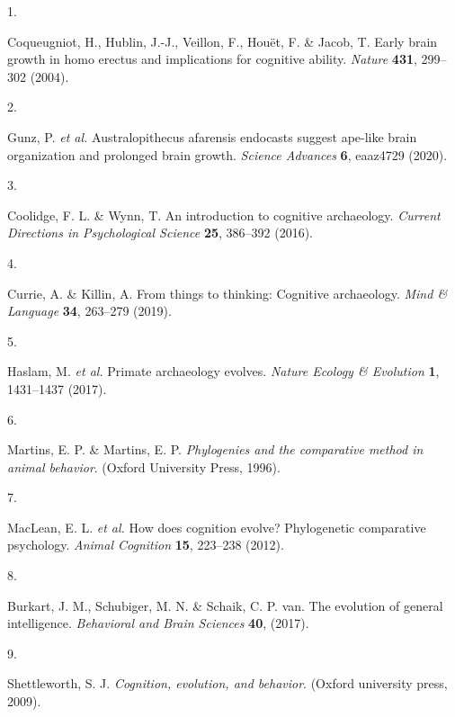 \documentclass[
  man,floatsintext]{apa6}
\newlength{\cslhangindent}
\newlength{\csllabelwidth}
\newlength{\cslentryspacingunit} %
\newenvironment{CSLReferences}[2] %
 {%
  \setlength{\parindent}{0pt}
  \ifodd #1
  \let\oldpar\par
  \def\par{\hangindent=\cslhangindent\oldpar}
  \fi
  \setlength{\parskip}{#2\cslentryspacingunit}
 }%
 {}
\newcommand{\CSLLeftMargin}[1]{\parbox[t]{\csllabelwidth}{#1}}
\newcommand{\CSLRightInline}[1]{\parbox[t]{\linewidth - \csllabelwidth}{#1}\break}
\begin{document}
\hypertarget{refs}{}
\begin{CSLReferences}{0}{0}
\leavevmode{}%
\CSLLeftMargin{1. }%
\CSLRightInline{Coqueugniot, H., Hublin, J.-J., Veillon, F., Houët, F. \& Jacob, T. Early brain growth in homo erectus and implications for cognitive ability. \emph{Nature} \textbf{431}, 299--302 (2004).}

\leavevmode{}%
\CSLLeftMargin{2. }%
\CSLRightInline{Gunz, P. \emph{et al.} Australopithecus afarensis endocasts suggest ape-like brain organization and prolonged brain growth. \emph{Science Advances} \textbf{6}, eaaz4729 (2020).}

\leavevmode{}%
\CSLLeftMargin{3. }%
\CSLRightInline{Coolidge, F. L. \& Wynn, T. An introduction to cognitive archaeology. \emph{Current Directions in Psychological Science} \textbf{25}, 386--392 (2016).}

\leavevmode{}%
\CSLLeftMargin{4. }%
\CSLRightInline{Currie, A. \& Killin, A. From things to thinking: Cognitive archaeology. \emph{Mind \& Language} \textbf{34}, 263--279 (2019).}

\leavevmode{}%
\CSLLeftMargin{5. }%
\CSLRightInline{Haslam, M. \emph{et al.} Primate archaeology evolves. \emph{Nature Ecology \& Evolution} \textbf{1}, 1431--1437 (2017).}

\leavevmode{}%
\CSLLeftMargin{6. }%
\CSLRightInline{Martins, E. P. \& Martins, E. P. \emph{Phylogenies and the comparative method in animal behavior}. (Oxford University Press, 1996).}

\leavevmode{}%
\CSLLeftMargin{7. }%
\CSLRightInline{MacLean, E. L. \emph{et al.} How does cognition evolve? Phylogenetic comparative psychology. \emph{Animal Cognition} \textbf{15}, 223--238 (2012).}

\leavevmode{}%
\CSLLeftMargin{8. }%
\CSLRightInline{Burkart, J. M., Schubiger, M. N. \& Schaik, C. P. van. The evolution of general intelligence. \emph{Behavioral and Brain Sciences} \textbf{40}, (2017).}

\leavevmode{}%
\CSLLeftMargin{9. }%
\CSLRightInline{Shettleworth, S. J. \emph{Cognition, evolution, and behavior}. (Oxford university press, 2009).}


\end{CSLReferences}
\end{document}
